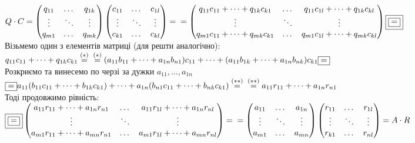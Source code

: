 \documentclass[a4paper, 10pt]{article}
\theoremstyle{theoremdd}
\begin{document}
	$Q \cdot C = \begin{pmatrix}
	q_{11} & \dots & q_{1k} \\
	\vdots & \ddots & \vdots \\
	q_{m1} & \dots & q_{mk}
	\end{pmatrix} \begin{pmatrix}
	c_{11} & \dots & c_{1l} \\
	\vdots & \ddots & \vdots \\
	c_{k1} & \dots & c_{kl}
	\end{pmatrix} = \\ = \begin{pmatrix}
	q_{11}c_{11} + \dots + q_{1k}c_{k1} & \dots & q_{11}c_{1l} + \dots + q_{1k}c_{kl} \\
	\vdots & \ddots & \vdots \\
	q_{m1}c_{11} + \dots + q_{mk}c_{k1} & \dots & q_{m1}c_{1l} + \dots + q_{mk}c_{kl} \\
	\end{pmatrix} \boxed{\boxed{=}}$\\
	Візьмемо один з елементів матриці (для решти аналогічно):\\
	$q_{11}c_{11} + \dots + q_{1k}c_{k1} \overset{(*)}{=} \\ \overset{(*)}{=} (a_{11}b_{11} + \dots + a_{1n}b_{n1})c_{11} + \dots + (a_{11}b_{1k} + \dots + a_{1n}b_{nk})c_{k1} \boxed{=}$\\
	Розкриємо та винесемо по черзі за дужки $a_{11}, \dots, a_{1n}$\\
	$\boxed{=} a_{11}(b_{11}c_{11} + \dots + b_{1k}c_{k1}) + \dots + a_{1n}(b_{n1}c_{11} + \dots + b_{nk}c_{k1}) \overset{(**)}{=} \\ \overset{(**)}{=} a_{11}r_{11} + \dots + a_{1n}r_{n1}$\\
	Тоді продовжимо рівність:\\
	$\boxed{\boxed{=}} \begin{pmatrix}
	a_{11}r_{11} + \dots + a_{1n}r_{n1} & \dots & a_{11}r_{1l} + \dots + a_{1n}r_{nl} \\
	\vdots & \ddots & \vdots \\
	a_{m1}r_{11} + \dots + a_{mn}r_{n1} & \dots & a_{m1}r_{1l} + \dots + a_{mn}r_{nl} \\
	\end{pmatrix} = \\ = 
	\begin{pmatrix}
	a_{11} & \dots & a_{1n} \\
	\vdots & \ddots & \vdots \\
	a_{m1} & \dots & a_{mn} \\
	\end{pmatrix} \begin{pmatrix}
	r_{11} & \dots & r_{1l} \\
	\vdots & \ddots & \vdots \\
	r_{k1} & \dots & r_{nl}
	\end{pmatrix} = A \cdot R$\\
\end{document}

